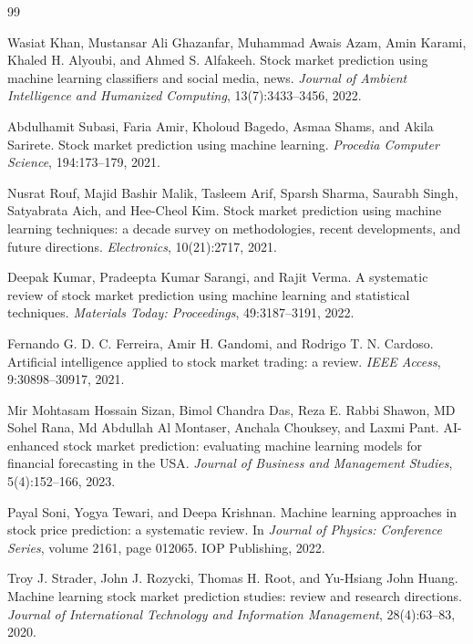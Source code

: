 \documentclass[11pt,a4paper]{article}
\begin{document}
\begin{thebibliography}{99}

 Wasiat Khan, Mustansar Ali Ghazanfar, Muhammad Awais Azam, Amin Karami,
Khaled H. Alyoubi, and Ahmed S. Alfakeeh. Stock market prediction using machine learning
classifiers and social media, news. \textit{Journal of Ambient Intelligence and Humanized
Computing}, 13(7):3433--3456, 2022.

 Abdulhamit Subasi, Faria Amir, Kholoud Bagedo, Asmaa Shams, and Akila
Sarirete. Stock market prediction using machine learning. \textit{Procedia Computer Science},
194:173--179, 2021.

 Nusrat Rouf, Majid Bashir Malik, Tasleem Arif, Sparsh Sharma, Saurabh Singh,
Satyabrata Aich, and Hee-Cheol Kim. Stock market prediction using machine learning techniques: a
decade survey on methodologies, recent developments, and future directions. \textit{Electronics},
10(21):2717, 2021.

 Deepak Kumar, Pradeepta Kumar Sarangi, and Rajit Verma. A systematic review
of stock market prediction using machine learning and statistical techniques. \textit{Materials
Today: Proceedings}, 49:3187--3191, 2022.

 Fernando G. D. C. Ferreira, Amir H. Gandomi, and Rodrigo T. N. Cardoso.
Artificial intelligence applied to stock market trading: a review. \textit{IEEE Access}, 9:30898--30917,
2021.

 Mir Mohtasam Hossain Sizan, Bimol Chandra Das, Reza E. Rabbi Shawon, MD
Sohel Rana, Md Abdullah Al Montaser, Anchala Chouksey, and Laxmi Pant. AI-enhanced stock market
prediction: evaluating machine learning models for financial forecasting in the USA. \textit{Journal of
Business and Management Studies}, 5(4):152--166, 2023.

 Payal Soni, Yogya Tewari, and Deepa Krishnan. Machine learning approaches in
stock price prediction: a systematic review. In \textit{Journal of Physics: Conference Series}, volume
2161, page 012065. IOP Publishing, 2022.

 Troy J. Strader, John J. Rozycki, Thomas H. Root, and Yu-Hsiang John Huang.
Machine learning stock market prediction studies: review and research directions. \textit{Journal of
International Technology and Information Management}, 28(4):63--83, 2020.


\end{thebibliography}
\end{document}
